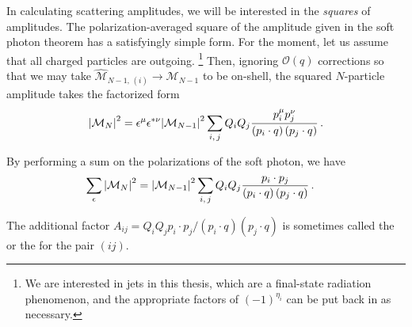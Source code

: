 \begin{example}
    \label{ex:qed-antennae}
    In calculating scattering amplitudes, we will be interested in the \textit{squares} of amplitudes.
    The polarization-averaged square of the amplitude given in the soft photon theorem has a satisfyingly simple form.
    For the moment, let us assume that all charged particles are outgoing.%
    \footnote{
        We are interested in jets in this thesis, which are a final-state radiation phenomenon, and the appropriate factors of \((-1)^{\eta_i}\) can be put back in as necessary.
    }
    Then, ignoring \(\mathcal{O}(q)\) corrections so that we may take \(\widehat{\mathcal{M}}_{N-1,\,(i)} \to \mathcal{M}_{N-1}\) to be on-shell, the squared \(N\)-particle amplitude takes the factorized form
    \begin{align}
        \abs{\mathcal{M}_N}^2
        =
        \epsilon^{\mu} \epsilon^{*\nu}
        \abs{\mathcal{M}_{N-1}}^2
        \sum_{i,\,j}
        Q_i Q_j
        \frac{p_i^\mu p_j^\nu}
            {\left(p_i\cdot q\right)\left(p_j \cdot q\right)}
        \,.
    \end{align}

    By performing a sum on the polarizations of the soft photon, we have
    \begin{align}
        \sum_{\epsilon}
        \abs{\mathcal{M}_N}^2
        &=
        \abs{\mathcal{M}_{N-1}}^2
        \sum_{i,\,j}
        Q_i Q_j
        \frac{p_i \cdot p_j}
            {\left(p_i\cdot q\right)\left(p_j \cdot q\right)}
        \,.
    \end{align}

    The additional factor \(A_{ij} = Q_i Q_j p_i \cdot p_j / (p_i \cdot q) (p_j \cdot q)\) is sometimes called the  or the  for the pair \((ij)\).
\end{example}


